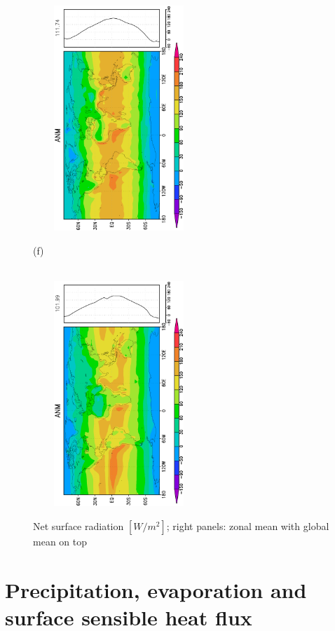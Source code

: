 \documentclass[12pt,a4paper,twoside,openright,headinclude,liststotoc,bibtotoc]{scrreprt}
\begin{document}
\begin{figure}[H]
{\includegraphics[height=8.5cm,width=6.5cm,angle=-90]
{eps/zonaltmsfcnetrad.eps}
}
\parbox{8.5cm}{\hspace{0.50cm}\begin{scriptsize}(f)\end{scriptsize} \vspace{-0.7cm} \\
\includegraphics[height=8.5cm,width=6.5cm,angle=-90]
{eps/zonalt21tmsfcnetrad.eps}
}
\caption[Net surface radiation]{Net surface radiation $[W/m^2]$; right panels: zonal mean with global mean on top}
\label{img:sfcnetrad}
\end{figure}


\vspace{-0.4cm}
\chapter{Precipitation, evaporation and surface sensible heat flux}
\vspace{-0.4cm}
\end{document}

